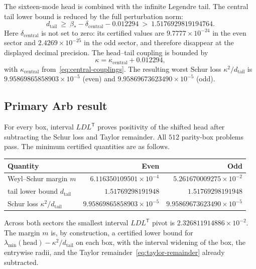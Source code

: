 \documentclass[11pt,a4paper]{article}
\theoremstyle{plain}
\theoremstyle{definition}
\numberwithin{equation}{section}
\begin{document}
The sixteen-mode head is combined with the infinite Legendre tail. The central
tail lower bound is reduced by the full perturbation norm:
\begin{equation}\label{eq:dtail}
d_{\mathrm{tail}}\ \ge\ \beta_*-\delta_{\mathrm{central}}-0.012294
\ >\ 1.5176929819194764 .
\end{equation}
Here $\delta_{\mathrm{central}}$ is not set to zero: its certified values are
$9.7777\times10^{-24}$ in the even sector and $2.4269\times10^{-25}$ in the
odd sector, and therefore disappear at the displayed decimal precision. The
head--tail coupling is bounded by
\begin{equation}\label{eq:kappa}
\kappa=\kappa_{\mathrm{central}}+0.012294,
\end{equation}
with $\kappa_{\mathrm{central}}$ from~\eqref{eq:central-couplings}. The
resulting worst Schur loss $\kappa^2/d_{\mathrm{tail}}$ is
$9.95869865858903\times10^{-5}$ (even) and $9.95869673623490\times10^{-5}$
(odd).

\subsection{Primary Arb result}

For every box, interval $LDL^{\mathsf T}$ proves positivity of the shifted
head after subtracting the Schur loss and Taylor remainder. All $512$
parity-box problems pass. The minimum certified quantities are as follows.

\begin{center}
\begin{tabular}{lrr}
\toprule
Quantity & Even & Odd\\
\midrule
Weyl--Schur margin $m$ & $6.116350109501\times10^{-4}$ & $5.261670009275\times10^{-2}$\\
tail lower bound $d_{\mathrm{tail}}$ & $1.51769298191948$ & $1.51769298191948$\\
Schur loss $\kappa^2/d_{\mathrm{tail}}$ & $9.95869865858903\times10^{-5}$ & $9.95869673623490\times10^{-5}$\\
\bottomrule
\end{tabular}
\end{center}

Across both sectors the smallest interval $LDL^{\mathsf T}$ pivot is
$2.326811914886\times10^{-2}$. The margin $m$ is, by construction, a certified
lower bound for $\lambda_{\min}(\text{head})-\kappa^2/d_{\mathrm{tail}}$ on
each box, with the interval widening of the box, the entrywise radii, and the
Taylor remainder~\eqref{eq:taylor-remainder} already subtracted.
\end{document}
